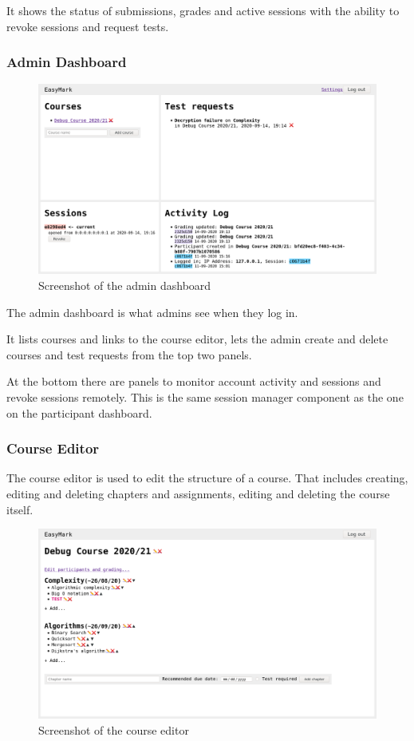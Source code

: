 \documentclass[12pt,a4paper,oneside]{report}
\begin{document}
	It shows the status of submissions, grades and active sessions with the ability to revoke sessions and request tests.

	\subsubsection{Admin Dashboard}
	\begin{figure}[H]
		\centering
		\includegraphics[width=\textwidth]{easymark_admin_dashboard.png}
		\caption{Screenshot of the admin dashboard}
	\end{figure}

	The admin dashboard is what admins see when they log in.

	It lists courses and links to the course editor, lets the admin create and delete courses and test requests from the top two panels.

	At the bottom there are panels to monitor account activity and sessions and revoke sessions remotely. This is the same session manager component as the one on the participant dashboard.

	\pagebreak
	\subsubsection{Course Editor}
	The course editor is used to edit the structure of a course. That includes creating, editing and deleting chapters and assignments, editing and deleting the course itself.

	\begin{figure}[H]
		\centering
		\includegraphics[width={\textwidth}]{easymark_course_editor.png}
		\vskip0pt
		\caption{Screenshot of the course editor}
	\end{figure}
\end{document}
